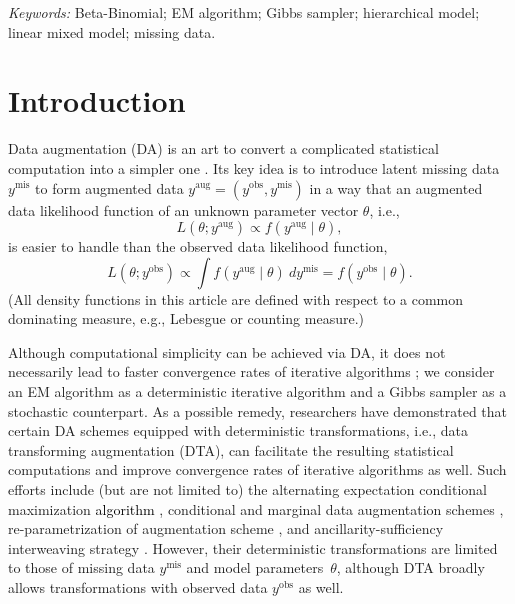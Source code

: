 \documentclass[12pt]{article}
\begin{document}
\noindent%
{\it Keywords:}  Beta-Binomial; EM algorithm;  Gibbs sampler; hierarchical model; linear mixed model; missing data.


{} %

\newpage

\section{Introduction}\label{sec1}

Data augmentation (DA) is an art to convert a complicated statistical computation into a simpler one \citep{tanner1987calculation, van2001art}. Its key idea is to introduce latent missing data $y^{\textrm{mis}}$ to form augmented data $y^{\textrm{aug}}=(y^{\textrm{obs}}, y^{\textrm{mis}})$ in a way that  an augmented data likelihood function of an unknown parameter vector $\theta$, i.e.,
$$
L(\theta; y^{\textrm{aug}})\propto f(y^{\textrm{aug}}\mid\theta),
$$ 
is easier to handle than the observed data likelihood function, 
$$
L(\theta; y^{\textrm{obs}})\propto \int f(y^{\textrm{aug}} \mid \theta)~dy^{\textrm{mis}}=f(y^{\textrm{obs}}\mid\theta).
$$ (All density functions in this article are defined with respect to a common dominating measure, e.g., Lebesgue or counting measure.)


Although computational simplicity can be achieved via DA, it does not necessarily lead to faster convergence rates of iterative algorithms  \citep{meng1997folksong}; we consider an EM algorithm \citep{dempster1977maximum} as a deterministic iterative algorithm  and a Gibbs sampler \citep{geman1984stochastic} as  a stochastic counterpart. As a possible remedy, researchers have demonstrated that certain DA schemes equipped with  deterministic  transformations, i.e., data transforming augmentation (DTA), can facilitate the resulting statistical computations and improve convergence rates of iterative algorithms as well. Such efforts include (but are not limited to) the  alternating expectation conditional maximization \textcolor{black}{algorithm} \citep{meng1997folksong}, conditional and marginal data augmentation schemes \citep{meng1999seeking}, re-parametrization of augmentation scheme \citep{papa2007repara, papa2008repara}, and ancillarity-sufficiency interweaving strategy \citep{yu2011}. However, their deterministic  transformations  are limited to those of missing data $y^{\textrm{mis}}$ and model parameters~$\theta$,  although DTA broadly allows transformations with observed data $y^{\textrm{obs}}$ as well.
\end{document}
